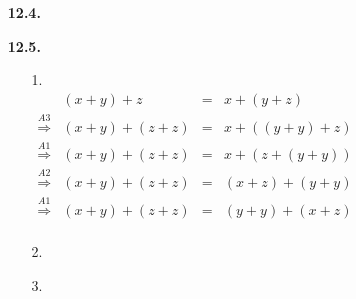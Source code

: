 \documentclass[a4paper,11pt,fleqn]{scrartcl}
\begin{document}
\begin{enumerate}
\begin{enumerate}
			\item[4.] \quad \\
			\todo
		\end{enumerate}
		\item[\textbf{12.4.}] \quad \\
		\todo
		\item[\textbf{12.5.}]
		\begin{enumerate}
			\item[1.] \quad \\
			\(
			\begin{array}{crcl}
				& (x + y) + z &=& x + (y + z) \\
				\overset{A3}{\Rightarrow} & (x + y) + (z + z) &=& x + ((y + y) + z) \\
				\overset{A1}{\Rightarrow} & (x + y) + (z + z) &=& x + (z + (y + y)) \\
				\overset{A2}{\Rightarrow} & (x + y) + (z + z) &=& (x + z) + (y + y) \\
				\overset{A1}{\Rightarrow} & (x + y) + (z + z) &=& (y + y) + (x + z) \\
			\end{array}
			\)
			\item[2.] \quad \\
			\todo
			\item[3.] \quad \\
			\todo
		\end{enumerate}
	\end{enumerate}
\end{document}
